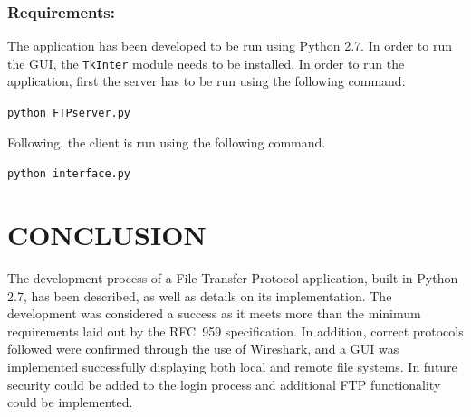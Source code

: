 \documentclass[10pt,twocolumn]{witseiepaper}
\begin{document}
\subsubsection*{Requirements: }
The application has been developed to be run using Python 2.7. In order to run the GUI, the \texttt{TkInter} module needs to be installed. In order to run the application, first the server has to be run using the following command:

\texttt{python FTPserver.py}

Following, the client is run using the following command.

\texttt{python interface.py}


\section{CONCLUSION}
The development process of a File Transfer Protocol application, built in Python 2.7, has been described, as well as details on its implementation. The development was considered a success as it meets more than the minimum requirements laid out by the RFC~959 specification. In addition, correct protocols followed were confirmed through the use of Wireshark, and a GUI was implemented successfully displaying both local and remote file systems. In future security could be added to the login process and additional FTP functionality could be implemented.

%



\newpage
\onecolumn
\end{document}
